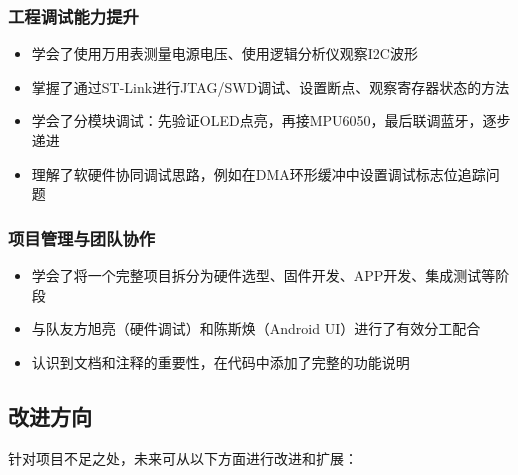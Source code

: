 \subsubsection{工程调试能力提升}
\begin{itemize}
    \item 学会了使用万用表测量电源电压、使用逻辑分析仪观察I2C波形
    \item 掌握了通过ST-Link进行JTAG/SWD调试、设置断点、观察寄存器状态的方法
    \item 学会了分模块调试：先验证OLED点亮，再接MPU6050，最后联调蓝牙，逐步递进
    \item 理解了软硬件协同调试思路，例如在DMA环形缓冲中设置调试标志位追踪问题
\end{itemize}

\subsubsection{项目管理与团队协作}
\begin{itemize}
    \item 学会了将一个完整项目拆分为硬件选型、固件开发、APP开发、集成测试等阶段
    \item 与队友方旭亮（硬件调试）和陈斯焕（Android UI）进行了有效分工配合
    \item 认识到文档和注释的重要性，在代码中添加了完整的功能说明
\end{itemize}

\subsection{改进方向}
针对项目不足之处，未来可从以下方面进行改进和扩展：

